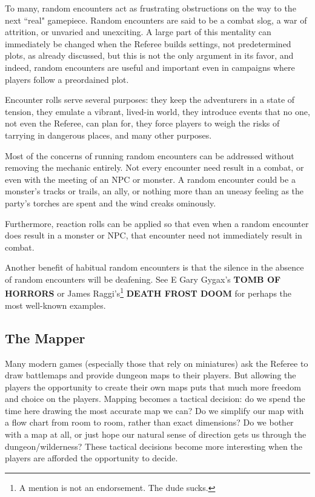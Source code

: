\documentclass[twoside]{article}
\begin{document}
To many, random encounters act as frustrating obstructions on the way to the next ``real" gamepiece. Random encounters are said to be a combat slog, a war of attrition, or unvaried and unexciting. A large part of this mentality can immediately be changed when the Referee builds settings, not predetermined plots, as already discussed, but this is not the only argument in its favor, and indeed, random encounters are useful and important even in campaigns where players follow a preordained plot. 

\bigbreak

Encounter rolls serve several purposes: they keep the adventurers in a state of tension, they emulate a vibrant, lived-in world, they introduce events that no one, not even the Referee, can plan for, they force players to weigh the risks of tarrying in dangerous places, and many other purposes.

\bigbreak

Most of the concerns of running random encounters can be addressed without removing the mechanic entirely. Not every encounter need result in a combat, or even with the meeting of an NPC or monster. A random encounter could be a monster's tracks or trails, an ally, or nothing more than an uneasy feeling as the party's torches are spent and the wind creaks ominously.

\bigbreak

Furthermore, reaction rolls can be applied so that even when a random encounter does result in a monster or NPC, that encounter need not immediately result in combat.

\bigbreak

Another benefit of habitual random encounters is that the silence in the absence of random encounters will be deafening. See E Gary Gygax's \textbf{TOMB OF HORRORS} or James Raggi's\footnote{A mention is not an endorsement. The dude sucks.} \textbf{DEATH FROST DOOM} for perhaps the most well-known examples.

\subsection*{The Mapper}

Many modern games (especially those that rely on miniatures) ask the Referee to draw battlemaps and provide dungeon maps to their players. But allowing the players the opportunity to create their own maps puts that much more freedom and choice on the players. Mapping becomes a tactical decision: do we spend the time here drawing the most accurate map we can? Do we simplify our map with a flow chart from room to room, rather than exact dimensions? Do we bother with a map at all, or just hope our natural sense of direction gets us through the dungeon/wilderness? These tactical decisions become more interesting when the players are afforded the opportunity to decide.
\end{document}
